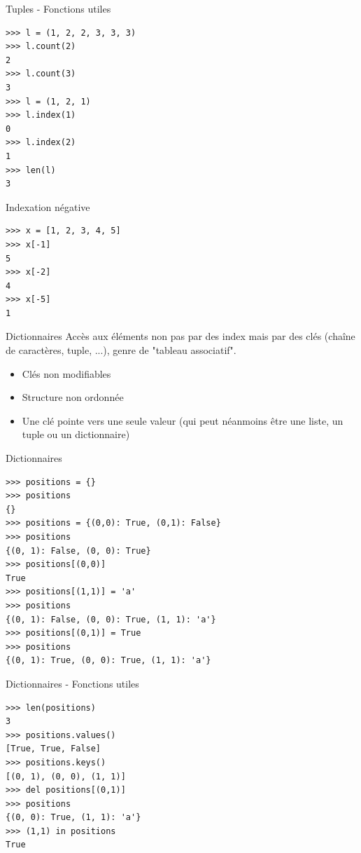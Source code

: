 \documentclass{beamer}
\begin{document}
\begin{frame}[fragile]{Tuples - Fonctions utiles}
\begin{lstlisting}[multicols=2]
>>> l = (1, 2, 2, 3, 3, 3)
>>> l.count(2)
2
>>> l.count(3)
3
>>> l = (1, 2, 1)
>>> l.index(1)
0
>>> l.index(2)
1
>>> len(l)
3
\end{lstlisting}
\end{frame}

\begin{frame}[fragile]{Indexation négative}
\begin{lstlisting}
>>> x = [1, 2, 3, 4, 5]
>>> x[-1]
5
>>> x[-2]
4
>>> x[-5]
1
\end{lstlisting}
\end{frame}



\begin{frame}[fragile]{Dictionnaires}
Accès aux éléments non pas par des index mais par des clés (chaîne de caractères, tuple, ...), genre de "tableau associatif".\\
\begin{itemize}
 \item Clés non modifiables
 \item Structure non ordonnée
 \item Une clé pointe vers une seule valeur (qui peut néanmoins être une liste, un tuple ou un dictionnaire)
\end{itemize}
\end{frame}

\begin{frame}[fragile]{Dictionnaires}
\begin{lstlisting}
>>> positions = {}
>>> positions
{}
>>> positions = {(0,0): True, (0,1): False}
>>> positions
{(0, 1): False, (0, 0): True}
>>> positions[(0,0)]
True
>>> positions[(1,1)] = 'a'
>>> positions
{(0, 1): False, (0, 0): True, (1, 1): 'a'}
>>> positions[(0,1)] = True
>>> positions
{(0, 1): True, (0, 0): True, (1, 1): 'a'}
\end{lstlisting}
\end{frame}


\begin{frame}[fragile]{Dictionnaires - Fonctions utiles}
\begin{lstlisting}
>>> len(positions)
3
>>> positions.values()
[True, True, False]
>>> positions.keys()
[(0, 1), (0, 0), (1, 1)]
>>> del positions[(0,1)]
>>> positions
{(0, 0): True, (1, 1): 'a'}
>>> (1,1) in positions
True
\end{lstlisting}
\end{frame}
\end{document}
